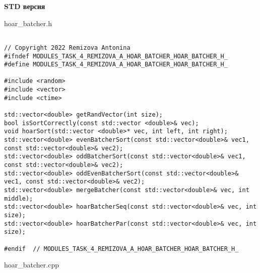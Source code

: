 \documentclass{report}
\begin{document}
\textbf{STD версия}
\par hoar\_batcher.h
\begin{lstlisting}

// Copyright 2022 Remizova Antonina
#ifndef MODULES_TASK_4_REMIZOVA_A_HOAR_BATCHER_HOAR_BATCHER_H_
#define MODULES_TASK_4_REMIZOVA_A_HOAR_BATCHER_HOAR_BATCHER_H_

#include <random>
#include <vector>
#include <ctime>

std::vector<double> getRandVector(int size);
bool isSortCorrectly(const std::vector <double>& vec);
void hoarSort(std::vector <double>* vec, int left, int right);
std::vector<double> evenBatcherSort(const std::vector<double>& vec1, const std::vector<double>& vec2);
std::vector<double> oddBatcherSort(const std::vector<double>& vec1, const std::vector<double>& vec2);
std::vector<double> oddEvenBatcherSort(const std::vector<double>& vec1, const std::vector<double>& vec2);
std::vector<double> mergeBatcher(const std::vector<double>& vec, int middle);
std::vector<double> hoarBatcherSeq(const std::vector<double>& vec, int size);
std::vector<double> hoarBatcherPar(const std::vector<double>& vec, int size);

#endif  // MODULES_TASK_4_REMIZOVA_A_HOAR_BATCHER_HOAR_BATCHER_H_

\end{lstlisting}
\par hoar\_batcher.cpp
\end{document}

